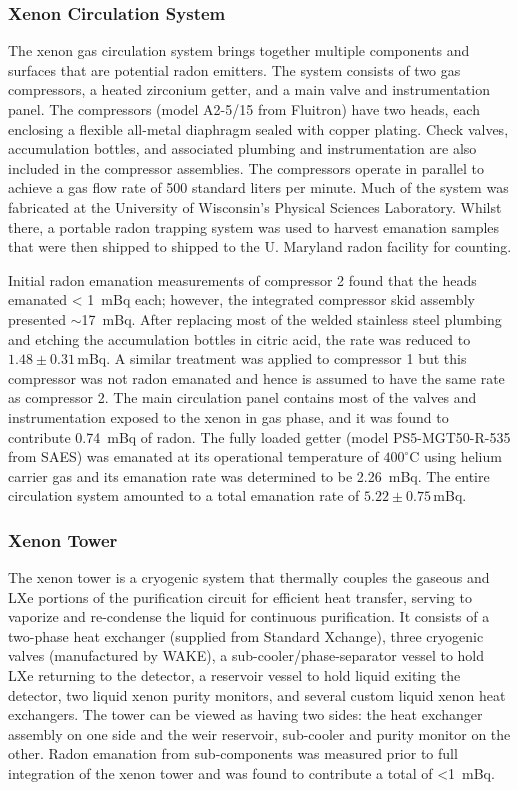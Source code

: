 \subsubsection{Xenon Circulation System}

The xenon gas circulation system brings together multiple components and surfaces that are potential radon emitters. The system consists of two gas compressors, a heated zirconium getter, and a main valve and instrumentation panel. The compressors (model A2-5/15 from Fluitron) have two heads, each enclosing a flexible all-metal diaphragm sealed with copper plating. Check valves, accumulation bottles, and associated plumbing and instrumentation are also included in the compressor assemblies. The compressors operate in parallel to achieve a gas flow rate of 500 standard liters per minute. Much of the system was fabricated at the University of Wisconsin's Physical Sciences Laboratory. Whilst there, a portable radon trapping system was used to harvest emanation samples that were then shipped to shipped to the U. Maryland radon facility for counting.

Initial radon emanation measurements of compressor 2 found that the heads emanated \SI{< 1}{\milli\becquerel} each; however, the integrated compressor skid assembly presented $\sim$\SI{17}{\milli\becquerel}. After replacing most of the welded stainless steel plumbing and etching the accumulation bottles in citric acid, the rate was reduced to $1.48\pm0.31$\,mBq. A similar treatment was applied to compressor 1 but this compressor was not radon emanated and hence is assumed to have the same rate as compressor 2. The main circulation panel contains most of the valves and instrumentation exposed to the xenon in gas phase, and it was found to contribute \SI{0.74}{\milli\becquerel} of radon. The fully loaded getter (model PS5-MGT50-R-535 from SAES) was emanated at its operational temperature of $400 ^{\circ}$C using helium carrier gas and its emanation rate was determined to be \SI{2.26}{\milli\becquerel}. The entire circulation system amounted to a total emanation rate of $5.22\pm0.75$\,mBq.


\subsubsection{Xenon Tower}

The xenon tower is a cryogenic system that thermally couples the gaseous and LXe portions of the purification circuit for efficient heat transfer, serving to vaporize and re-condense the liquid for continuous purification. It consists of a two-phase heat exchanger (supplied from Standard Xchange), three cryogenic valves (manufactured by WAKE), a sub-cooler/phase-separator vessel to hold LXe returning to the detector, a reservoir vessel to hold liquid exiting the detector, two liquid xenon purity monitors, and several custom liquid xenon heat exchangers. The tower can be viewed as having two sides: the heat exchanger assembly on one side and the weir reservoir, sub-cooler and purity monitor on the other. Radon emanation from sub-components was measured prior to full integration of the xenon tower and was found to contribute a total of \SI{<1}{\milli\becquerel}. 

